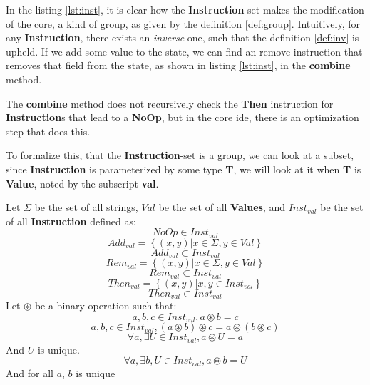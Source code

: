 In the listing \ref{lst:inst}, it is clear how the \textbf{Instruction}-set makes the
modification of the core, a kind of group, as given by the definition
\ref{def:group}. Intuitively, for any \textbf{Instruction}, there exists
an \textit{inverse} one, such that the definition \ref{def:inv} is upheld. If we
add some value to the state, we can find an remove instruction that removes
that field from the state, as shown in listing \ref{lst:inst}, in the
\textbf{combine} method.

\begin{remark}
  The \textbf{combine} method does not recursively check the \textbf{Then}
  instruction for \textbf{Instruction}s that lead to a \textbf{NoOp}, but in the
  core \gls*{ide}, there is an optimization step that does this.
\end{remark}

To formalize this, that the \textbf{Instruction}-set is a group, we can look at
a subset, since \textbf{Instruction} is parameterized by some type \textbf{T},
we will look at it when \textbf{T} is \textbf{Value}, noted by the subscript
\textbf{val}.

\begin{lemma} \label{lem:intr}
  Let $\Sigma$ be the set of all strings, $Val$ be the set of all
  \textbf{Values}, and
  $Inst_{val}$ be the set of all \textbf{Instruction} defined as:
  $$
    NoOp \in Inst_{val}
  $$
  $$
    Add_{val} = \left \{ (x, y) \vert x \in \Sigma, y \in Val \right \}
  $$
  $$
    Add_{val} \subset Inst_{val}
  $$
  $$
    Rem_{val} = \left \{ (x, y) \vert x \in \Sigma, y \in Val \right \}
  $$
  $$
    Rem_{val} \subset Inst_{val}
  $$
  $$
    Then_{val} = \left \{ (x, y) \vert x, y \in Inst_{val} \right \}
  $$
  $$
    Then_{val} \subset Inst_{val}
  $$
  Let $\circledast$ be a binary operation such that:
  $$
  a, b, c \in Inst_{val}, a \circledast b = c
  $$
  $$
  a, b, c \in Inst_{val}, \left ( a \circledast b \right ) \circledast c = a \circledast \left ( b \circledast c \right )
  $$
  $$
  \forall a, \exists U \in Inst_{val}, a \circledast U = a
  $$
  And $U$ is unique.
  $$
  \forall a, \exists b, U \in Inst_{val}, a \circledast b = U
  $$
  And for all $a$, $b$ is unique
\end{lemma}

